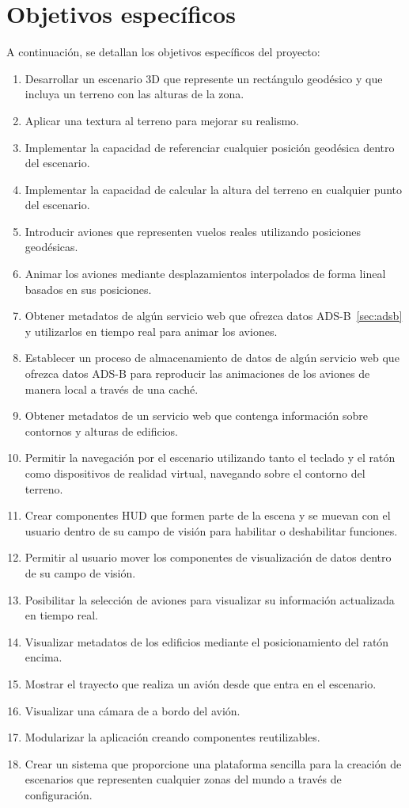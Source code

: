 \documentclass[a4paper, 11pt]{book}
\begin{document}
\section{Objetivos específicos} %
\label{sec:objetivosEspecificos} %
A continuación, se detallan los objetivos específicos del proyecto:
\begin{enumerate}
    \item Desarrollar un escenario 3D que represente un rectángulo geodésico y que incluya un terreno con las alturas de la zona.
    \item Aplicar una textura al terreno para mejorar su realismo.
    \item Implementar la capacidad de referenciar cualquier posición geodésica dentro del escenario.
    \item Implementar la capacidad de calcular la altura del terreno en cualquier punto del escenario.
    \item Introducir aviones que representen vuelos reales utilizando posiciones geodésicas.
    \item Animar los aviones mediante desplazamientos interpolados de forma lineal basados en sus posiciones.
    \item Obtener metadatos de algún servicio web que ofrezca datos \textsc{ADS-B}~\ref{sec:adsb} y utilizarlos en tiempo real para animar los aviones.
    \item Establecer un proceso de almacenamiento de datos de algún servicio web que ofrezca datos \textsc{ADS-B} para reproducir las animaciones de los aviones de manera local a través de una caché.
    \item Obtener metadatos de un servicio web que contenga información sobre contornos y alturas de edificios.
    \item Permitir la navegación por el escenario utilizando tanto el teclado y el ratón como dispositivos de realidad virtual, navegando sobre el contorno del terreno.
    \item Crear componentes \textsc{HUD} que formen parte de la escena y se muevan con el usuario dentro de su campo de visión para habilitar o deshabilitar funciones.
    \item Permitir al usuario mover los componentes de visualización de datos dentro de su campo de visión.
    \item Posibilitar la selección de aviones para visualizar su información actualizada en tiempo real.
    \item Visualizar metadatos de los edificios mediante el posicionamiento del ratón encima.
    \item Mostrar el trayecto que realiza un avión desde que entra en el escenario.
    \item Visualizar una cámara de a bordo del avión.
    \item Modularizar la aplicación creando componentes reutilizables.
    \item Crear un sistema que proporcione una plataforma sencilla para la creación de escenarios que representen cualquier zonas del mundo a través de configuración.
\end{enumerate}
\end{document}

